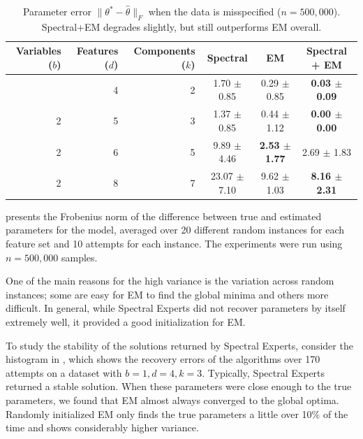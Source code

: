 \begin{table}[tbhp]
\caption{Parameter error $\|\theta^* - \hat \theta\|_F$ when the data is misspecified ($n = 500,000$).
Spectral+EM degrades slightly, but still outperforms EM overall.
}
\label{tbl:parameter-recovery-mis}
\vskip 0.15in
\begin{center}
\begin{small}
\begin{sc}

  \begin{tabular}{ r r r c c c }
\hline
\abovespace\belowspace
Variables ($b$) & Features ($d$) & Components ($k$) & Spectral & EM & Spectral + EM \\
\hline
\abovespace
 1 & 4 & 2 &  1.70 $\pm$ 0.85 & 0.29 $\pm$ 0.85 &  {\bf 0.03 $\pm$ 0.09} \\
 2 & 5 & 3 &  1.37 $\pm$ 0.85 & 0.44 $\pm$ 1.12 &  {\bf 0.00 $\pm$ 0.00} \\
 2 & 6 & 5 &  9.89 $\pm$ 4.46 & {\bf 2.53 $\pm$ 1.77} &  2.69 $\pm$ 1.83 \\
 2 & 8 & 7 & 23.07 $\pm$ 7.10 & 9.62 $\pm$ 1.03 &  {\bf 8.16 $\pm$ 2.31}  \\
\hline

\end{tabular}
\end{sc}
\end{small}
\end{center}
\vskip -0.1in
\end{table}


 presents the Frobenius norm of the
difference between true and estimated parameters for the model, averaged
over 20 different random instances for each feature set and 10 attempts
for each instance. The experiments were run using $n = 500,000$ samples.

One of the main reasons for the high variance is the variation across
random instances; some are easy for EM to find the global minima and
others more difficult. In general, while Spectral Experts did not
recover parameters by itself extremely well, it provided a good initialization for
EM.

To study the stability of the solutions returned by Spectral Experts,
consider the histogram in , which shows the recovery
errors of the algorithms over 170 attempts on a dataset with $b = 1, d = 4,
k = 3$. Typically, Spectral Experts returned a stable solution.
When these parameters were close enough to the true parameters, we found
that EM almost always converged to the global optima. Randomly
initialized EM only finds the true parameters a little over 10\% of the
time and shows considerably higher variance. 

